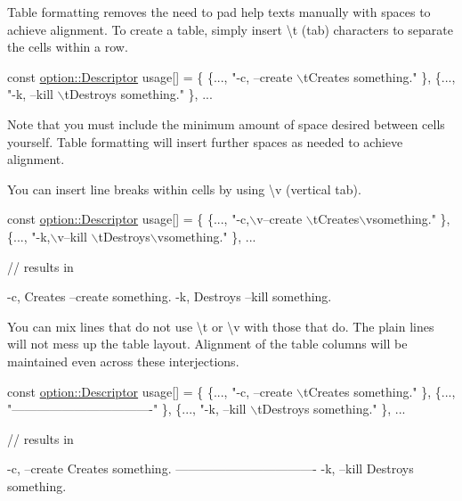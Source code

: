 Table formatting removes the need to pad help texts manually with spaces to achieve alignment. To create a table, simply insert \textbackslash{}t (tab) characters to separate the cells within a row.


\begin{DoxyCode}
\textcolor{keyword}{const} \hyperlink{structoption_1_1_descriptor}{option::Descriptor} usage[] = \{
\{..., \textcolor{stringliteral}{"-c, --create  \(\backslash\)tCreates something."} \},
\{..., \textcolor{stringliteral}{"-k, --kill  \(\backslash\)tDestroys something."} \}, ...
\end{DoxyCode}


Note that you must include the minimum amount of space desired between cells yourself. Table formatting will insert further spaces as needed to achieve alignment.

You can insert line breaks within cells by using \textbackslash{}v (vertical tab).


\begin{DoxyCode}
\textcolor{keyword}{const} \hyperlink{structoption_1_1_descriptor}{option::Descriptor} usage[] = \{
\{..., \textcolor{stringliteral}{"-c,\(\backslash\)v--create  \(\backslash\)tCreates\(\backslash\)vsomething."} \},
\{..., \textcolor{stringliteral}{"-k,\(\backslash\)v--kill  \(\backslash\)tDestroys\(\backslash\)vsomething."} \}, ...

\textcolor{comment}{// results in}

-c,       Creates
--create  something.
-k,       Destroys
--kill    something.
\end{DoxyCode}


You can mix lines that do not use \textbackslash{}t or \textbackslash{}v with those that do. The plain lines will not mess up the table layout. Alignment of the table columns will be maintained even across these interjections.


\begin{DoxyCode}
\textcolor{keyword}{const} \hyperlink{structoption_1_1_descriptor}{option::Descriptor} usage[] = \{
\{..., \textcolor{stringliteral}{"-c, --create  \(\backslash\)tCreates something."} \},
\{..., \textcolor{stringliteral}{"----------------------------------"} \},
\{..., \textcolor{stringliteral}{"-k, --kill  \(\backslash\)tDestroys something."} \}, ...

\textcolor{comment}{// results in}

-c, --create  Creates something.
----------------------------------
-k, --kill    Destroys something.
\end{DoxyCode}


